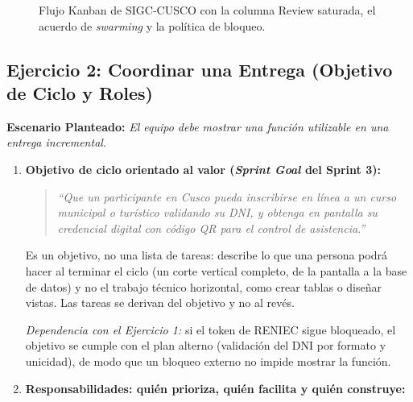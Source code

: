 \documentclass[11pt,a4paper]{article}
\begin{document}
\begin{figure}[H]
\caption{Flujo Kanban de SIGC-CUSCO con la columna Review saturada, el acuerdo de \textit{swarming} y la política de bloqueo.}
\label{fig:kanban_flow}
\end{figure}

\subsection{Ejercicio 2: Coordinar una Entrega (Objetivo de Ciclo y Roles)}
\textbf{Escenario Planteado:} \textit{El equipo debe mostrar una función utilizable en una entrega incremental.}

\begin{enumerate}
    \item \textbf{Objetivo de ciclo orientado al valor (\textit{Sprint Goal} del Sprint 3):}
    \begin{quote}
        \textit{``Que un participante en Cusco pueda inscribirse en línea a un curso municipal o turístico validando su DNI, y obtenga en pantalla su credencial digital con código QR para el control de asistencia.''}
    \end{quote}
    Es un objetivo, no una lista de tareas: describe lo que una persona podrá hacer al terminar el ciclo (un corte vertical completo, de la pantalla a la base de datos) y no el trabajo técnico horizontal, como crear tablas o diseñar vistas. Las tareas se derivan del objetivo y no al revés.

    \textit{Dependencia con el Ejercicio 1:} si el token de RENIEC sigue bloqueado, el objetivo se cumple con el plan alterno (validación del DNI por formato y unicidad), de modo que un bloqueo externo no impide mostrar la función.

    \item \textbf{Responsabilidades: quién prioriza, quién facilita y quién construye:}
\end{enumerate}
\end{document}
